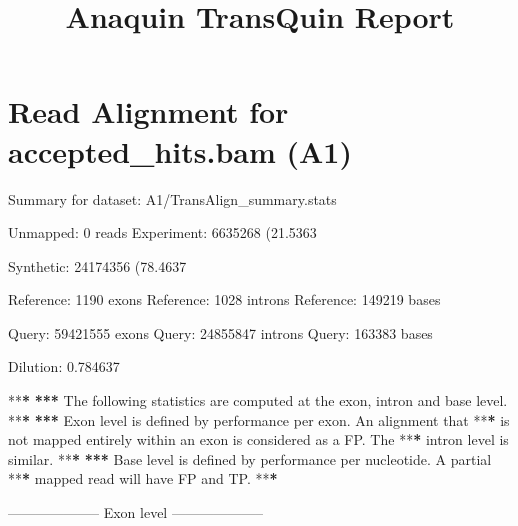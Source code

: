 \documentclass[]{article}
\title{Anaquin TransQuin Report}
\author{}
\date{}
\newenvironment{Shaded}{\begin{snugshade}}{\end{snugshade}}
\newcommand{\DecValTok}[1]{\textcolor[rgb]{0.00,0.00,0.81}{{#1}}}
\newcommand{\FloatTok}[1]{\textcolor[rgb]{0.00,0.00,0.81}{{#1}}}
\newcommand{\StringTok}[1]{\textcolor[rgb]{0.31,0.60,0.02}{{#1}}}
\newcommand{\ErrorTok}[1]{\textbf{{#1}}}
\newcommand{\NormalTok}[1]{{#1}}
\begin{document}
\maketitle


\section{Read Alignment for accepted\_hits.bam
(A1)}\label{read-alignment-for-acceptedux5fhits.bam-a1}

\begin{Shaded}
\begin{Highlighting}[]
\NormalTok{Summary for dataset:}\StringTok{ }\NormalTok{A1/TransAlign_summary.stats}

   \NormalTok{Unmapped:}\StringTok{   }\DecValTok{0} \NormalTok{reads}
   \NormalTok{Experiment:}\StringTok{ }\DecValTok{6635268} \NormalTok{(}\FloatTok{21.5363}\NormalTok{%
   \NormalTok{Synthetic:}\StringTok{  }\DecValTok{24174356} \NormalTok{(}\FloatTok{78.4637}\NormalTok{%

   \NormalTok{Reference:}\StringTok{  }\DecValTok{1190} \NormalTok{exons}
   \NormalTok{Reference:}\StringTok{  }\DecValTok{1028} \NormalTok{introns}
   \NormalTok{Reference:}\StringTok{  }\DecValTok{149219} \NormalTok{bases}

   \NormalTok{Query:}\StringTok{      }\DecValTok{59421555} \NormalTok{exons}
   \NormalTok{Query:}\StringTok{      }\DecValTok{24855847} \NormalTok{introns}
   \NormalTok{Query:}\StringTok{      }\DecValTok{163383} \NormalTok{bases}

   \NormalTok{Dilution:}\StringTok{   }\FloatTok{0.784637}

   \NormalTok{**}\ErrorTok{*}
\StringTok{   }\ErrorTok{***}\StringTok{ }\NormalTok{The following statistics are computed at the exon, intron and base level.}
   \NormalTok{**}\ErrorTok{*}
\StringTok{   }\ErrorTok{***}\StringTok{ }\NormalTok{Exon level is defined by performance per exon. An alignment that}
   \NormalTok{**}\ErrorTok{*}\StringTok{ }\NormalTok{is not mapped entirely within an exon is considered as a FP. The}
   \NormalTok{**}\ErrorTok{*}\StringTok{ }\NormalTok{intron level is similar.}
   \NormalTok{**}\ErrorTok{*}
\StringTok{   }\ErrorTok{***}\StringTok{ }\NormalTok{Base level is defined by performance per nucleotide. A partial}
   \NormalTok{**}\ErrorTok{*}\StringTok{ }\NormalTok{mapped read will have FP and TP.}
   \NormalTok{**}\ErrorTok{*}

\StringTok{   }\NormalTok{--------------------}\StringTok{ }\NormalTok{Exon level --------------------}

}}
\end{Highlighting}
\end{Shaded}
\end{document}
